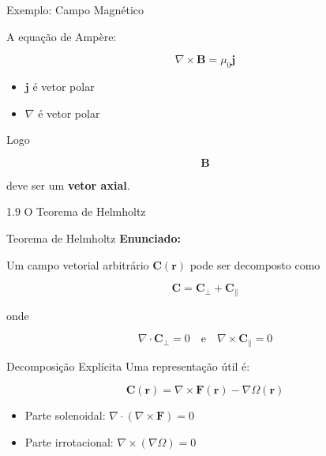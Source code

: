 \documentclass[aspectratio=169]{beamer}
\newcommand{\blue}[1]{\textcolor{myblue}{#1}}
\begin{document}
\begin{frame}{Exemplo: Campo Magnético}

A equação de Ampère:

\[
\nabla \times \mathbf B = \mu_0 \mathbf j
\]

\begin{itemize}
\item $\mathbf j$ é vetor polar
\item $\nabla$ é vetor polar
\end{itemize}

Logo

\[
\mathbf B
\]

deve ser um \textbf{vetor axial}.

\end{frame}

\begin{frame}[plain]
\centering
\vfill
{\Huge\blue{1.9 O Teorema de Helmholtz}}
\vfill
\end{frame}




\begin{frame}{Teorema de Helmholtz}
\textbf{Enunciado:}

Um campo vetorial arbitrário $\mathbf{C}(\mathbf{r})$ pode ser decomposto como

\begin{equation}
\mathbf{C} = \mathbf{C}_\perp + \mathbf{C}_\parallel
\end{equation}

onde

\begin{equation}
\nabla \cdot \mathbf{C}_\perp = 0
\quad \text{e} \quad
\nabla \times \mathbf{C}_\parallel = 0
\end{equation}
\end{frame}

\begin{frame}{Decomposição Explícita}
Uma representação útil é:

\begin{equation}
\mathbf{C}(\mathbf{r}) = \nabla \times \mathbf{F}(\mathbf{r}) - \nabla \Omega(\mathbf{r})
\end{equation}

\begin{itemize}
\item Parte solenoidal: $\nabla \cdot (\nabla \times \mathbf{F}) = 0$
\item Parte irrotacional: $\nabla \times (\nabla \Omega) = 0$
\end{itemize}
\end{frame}
\end{document}
